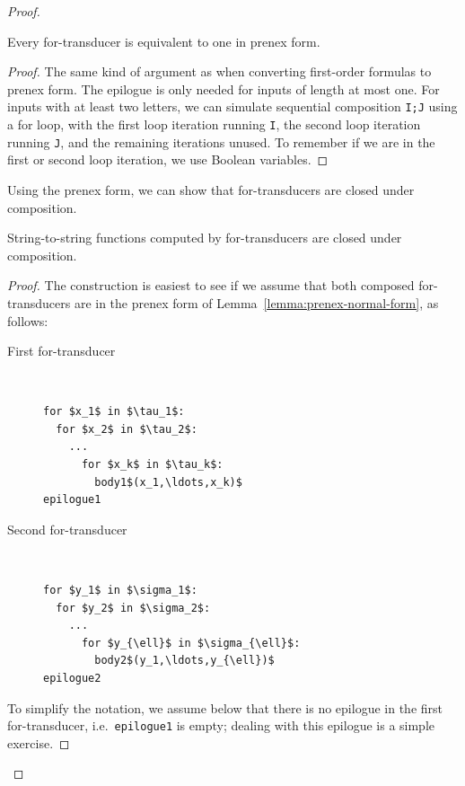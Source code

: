 \begin{proof}
        \begin{lemma}\label{lemma:prenex-normal-form}
            Every for-transducer is equivalent to one in prenex  form.
        \end{lemma}
        \begin{proof}
            The same kind of argument as when converting first-order formulas to prenex  form. The epilogue is only needed for inputs of length at most one. For inputs with at least two letters, we can simulate  sequential composition \texttt{I;J} using a for loop, with the first loop iteration running \texttt{I}, the second loop iteration running \texttt{J}, and the remaining iterations unused. To remember if we are in the first or second loop iteration, we use Boolean variables.
        \end{proof}

    Using the prenex  form, we can show that for-transducers are closed under composition.

\begin{lemma}\label{lem:for-closed-under-composition}
    String-to-string functions computed by for-transducers are closed under composition.
\end{lemma}
\begin{proof}
    The construction is easiest to see if we assume that both composed for-transducers are in the prenex  form of Lemma~\ref{lemma:prenex-normal-form}, as follows:
\begin{description}
  \item[First for-transducer] \ 
    \begin{lstlisting}
for $x_1$ in $\tau_1$:
  for $x_2$ in $\tau_2$:
    ...
      for $x_k$ in $\tau_k$:
        body1$(x_1,\ldots,x_k)$
epilogue1
            \end{lstlisting}
            \item[Second for-transducer] \ 
\begin{lstlisting}
for $y_1$ in $\sigma_1$:
  for $y_2$ in $\sigma_2$:
    ...
      for $y_{\ell}$ in $\sigma_{\ell}$:
        body2$(y_1,\ldots,y_{\ell})$
epilogue2
            \end{lstlisting}
            \end{description}    
    
    To simplify the notation, we assume below that there is no epilogue in the first for-transducer, i.e.~{\tt epilogue1} is empty; dealing with this epilogue is a simple exercise.   
 

\end{proof}
\end{proof}
